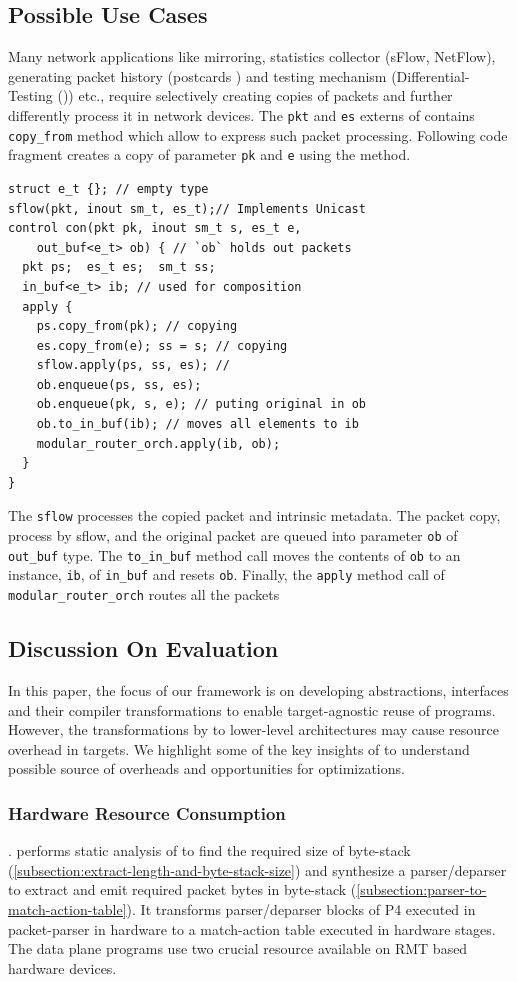 \documentclass[letterpaper,twocolumn,10pt]{article}
\begin{document}
\subsection{Possible Use Cases}
Many network applications like mirroring, statistics collector (sFlow, NetFlow), generating packet history (postcards \cite{179783}) and testing mechanism (Differential-Testing (\cite{Zheng:2018:PLV:3281411.3281436})) etc., require selectively creating copies of packets and further differently process it in network devices.
The \texttt{pkt} and \texttt{es} externs of \uarch contains \texttt{copy\_from} method which allow to express such packet processing.
Following code fragment creates a copy of parameter \texttt{pk} and \texttt{e} using the method.
\begin{lstlisting}[frame=none]
struct e_t {}; // empty type
sflow(pkt, inout sm_t, es_t);// Implements Unicast 
control con(pkt pk, inout sm_t s, es_t e, 
    out_buf<e_t> ob) { // `ob` holds out packets
  pkt ps;  es_t es;  sm_t ss;
  in_buf<e_t> ib; // used for composition
  apply {
    ps.copy_from(pk); // copying
    es.copy_from(e); ss = s; // copying
    sflow.apply(ps, ss, es); // 
    ob.enqueue(ps, ss, es);
    ob.enqueue(pk, s, e); // puting original in ob
    ob.to_in_buf(ib); // moves all elements to ib
    modular_router_orch.apply(ib, ob);
  }
}
\end{lstlisting}
The \texttt{sflow} processes the copied packet and intrinsic metadata.
The packet copy, process by sflow, and the original packet are queued into parameter \texttt{ob} of \texttt{out\_buf} type.
The \texttt{to\_in\_buf} method call moves the contents of \texttt{ob} to an instance, \texttt{ib}, of \texttt{in\_buf} and resets \texttt{ob}.
Finally, the \texttt{apply} method call of \texttt{modular\_router\_orch} routes all the packets

\subsection{Discussion On Evaluation}
In this paper, the focus of our framework is on developing abstractions, interfaces and their compiler transformations to enable target-agnostic reuse of programs. However, the transformations by \ucomp to lower-level architectures may cause resource overhead in targets. 
We highlight some of the key insights of \ucomp to understand possible source of overheads and opportunities for optimizations.

\subsubsection{Hardware Resource Consumption}. 
\ucomp performs static analysis of \uprograms to find the required size of byte-stack (\cref{subsection:extract-length-and-byte-stack-size}) and synthesize a parser/deparser to extract and emit required packet bytes in byte-stack (\cref{subsection:parser-to-match-action-table}). 
It transforms parser/deparser blocks of P4 executed in packet-parser in hardware to a match-action table executed in hardware stages. 
The data plane programs use two crucial resource available on RMT based hardware devices.
\end{document}
